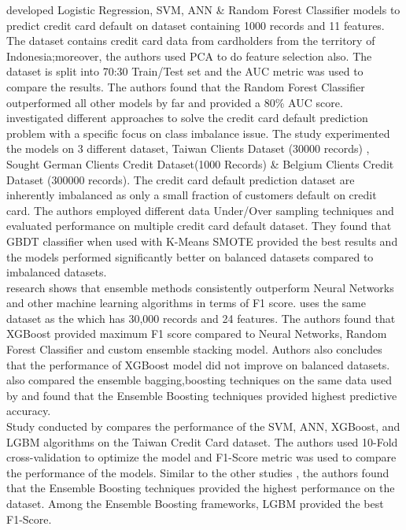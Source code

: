 \documentclass[twoside,11pt,a4paper]{article}
\begin{document}
\citep{widyadhanacredit} developed Logistic Regression, \acs{SVM}, \acs{ANN} \& Random Forest Classifier models to predict credit card default on dataset containing 1000 records and 11 features. The dataset contains credit card data from cardholders from the territory of Indonesia;moreover, the authors used \acf{PCA} to do feature selection also. The dataset is split into 70:30 Train/Test set and the \acs{AUC} metric was used to compare the results. The authors found that the Random Forest Classifier outperformed all other models by far and provided a 80\% \acs{AUC} score.\\


\citep{alam2020investigation} investigated different approaches to solve the credit card default prediction problem with a specific focus on class imbalance issue. The study experimented the models on 3 different dataset, Taiwan Clients Dataset (30000 records) \citep{yeh2009comparisons}, Sought German Clients Credit Dataset(1000 Records) \& Belgium Clients Credit Dataset (300000 records).  The credit card default prediction dataset are inherently imbalanced as only a small fraction of customers default on credit card. The authors employed different data Under/Over sampling techniques and evaluated performance on multiple credit card default dataset. They found that \acs{GBDT} classifier when used with K-Means \acs{SMOTE} provided the best results and the models performed significantly better on balanced datasets compared to imbalanced datasets.\\

\citep{faraj2021comparison} research shows that ensemble  methods  consistently  outperform  Neural  Networks  and  other  machine  learning algorithms in terms of F1 score. \citep{faraj2021comparison} uses the same dataset as the \citep{sayjadah2018credit} which has 30,000 records and 24 features. The authors found that \acs{XGBoost} provided maximum F1 score compared to Neural Networks, Random Forest Classifier and custom ensemble stacking model. Authors also concludes that the performance of \acs{XGBoost} model did not improve on balanced datasets. \citep{emil2019enhancing} also compared the ensemble bagging,boosting techniques on the same data used by \citep{faraj2021comparison} and found that 
the Ensemble Boosting techniques provided highest predictive accuracy.  \\

Study conducted by \cite{yang2018comparison} compares the performance of the \acs{SVM}, \acs{ANN}, \acs{XGBoost}, and \acs{LGBM} algorithms on the Taiwan Credit Card dataset. The authors used 10-Fold cross-validation to optimize the model and  F1-Score metric was used to compare the performance of the models. Similar to the other studies \citep{faraj2021comparison} \citep{emil2019enhancing}, the authors found that the Ensemble Boosting techniques provided the highest performance on the dataset. Among the Ensemble Boosting frameworks, \acs{LGBM} provided the best F1-Score.\\
\end{document}
